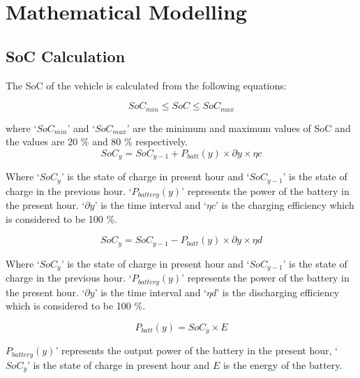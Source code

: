 	\chapter{Mathematical Modelling}
	\label{chap:mathmodel}
	
	\section{SoC Calculation}
	
	
		
	The SoC of the vehicle is calculated from the following equations:
	

			\begin{equation}
		                             SoC_{min} \leq SoC \leq SoC_{max}\label{eq:socminmax}
		    \end{equation}
	    
where `$SoC_{min}$'  and `$SoC_{max}$' are the minimum and maximum values of SoC and the values are 20 \% and 80 \% respectively.
		    \begin{equation}                         
		               SoC_{y} = SoC_{y-1} + P_{batt}(y) \times \partial y \times \eta c
			\end{equation}
		
		Where `$SoC_{y}$' is the state of charge in present hour and `$SoC_{y-1}$' is the state of charge in the previous hour. `$P_{battery}(y)$' represents the power of the battery in the present hour. `$\partial y$' is the time interval and `$\eta c$' is the charging efficiency which is considered to be 100 \%. 
		
		    \begin{equation}             
		               SoC_{y} = SoC_{y-1} - P_{batt}(y) \times \partial y \times \eta d
			\end{equation}
		
		Where `$SoC_{y}$' is the state of charge in present hour and `$SoC_{y-1}$' is the state of charge in the previous hour. `$P_{battery}(y)$' represents the power of the battery in the present hour. `$\partial y$' is the time interval and `$\eta d$' is the discharging efficiency which is considered to be 100 \%.
		
		    \begin{equation}             
		               P_{batt}(y) = SoC_{y} \times E
		    \end{equation}
	    
	    $P_{battery}(y)$' represents the output power of the battery in the present hour, `$SoC_{y}$' is the state of charge in present hour and $E$ is the energy of the battery. 
		 
